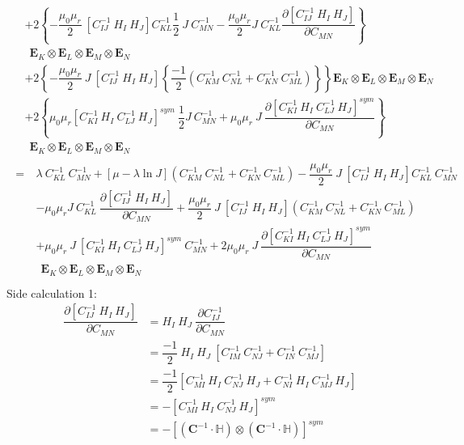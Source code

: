 \begin{align*}
\begin{split}
&+ 2 \left\lbrace - \dfrac{\mu_0 \mu_r}{2} \ [C^{-1}_{IJ} \ H_I \ H_J] C^{-1}_{KL} \dfrac{1}{2} \ J \ C^{-1}_{MN} - \dfrac{\mu_0 \mu_r}{2} J \ C^{-1}_{KL} \dfrac{\partial [C^{-1}_{IJ} \ H_I \ H_J]}{\partial C_{MN}} \right\rbrace \\
& \ \ \mathbf{E}_K \otimes \mathbf{E}_L \otimes \mathbf{E}_M \otimes \mathbf{E}_N \\
&+ 2 \left\lbrace - \dfrac{\mu_0 \mu_r}{2} \ J \ [C^{-1}_{IJ} \ H_I \ H_J] \left\lbrace \dfrac{-1}{2} (C^{-1}_{KM} \ C^{-1}_{NL} + C^{-1}_{KN} \ C^{-1}_{ML}) \right\rbrace \right\rbrace \mathbf{E}_K \otimes \mathbf{E}_L \otimes \mathbf{E}_M \otimes \mathbf{E}_N \\
&+ 2 \left\lbrace \mu_0 \mu_r [C^{-1}_{KI} \ H_I \ C^{-1}_{LJ} \ H_J]^{sym} \ \dfrac{1}{2} J \ C^{-1}_{MN} + \mu_0 \mu_r \ J \ \dfrac{\partial [C^{-1}_{KI} \ H_I \ C^{-1}_{LJ} \ H_J]^{sym}}{\partial C_{MN}} \right\rbrace \\
& \ \ \mathbf{E}_K \otimes \mathbf{E}_L \otimes \mathbf{E}_M \otimes \mathbf{E}_N
\end{split}\\
\begin{split}
=\ & \lambda \ C^{-1}_{KL} \ C^{-1}_{MN} + [\mu - \lambda \ln J] \left( C^{-1}_{KM} \ C^{-1}_{NL} + C^{-1}_{KN} \ C^{-1}_{ML} \right) - \dfrac{\mu_0 \mu_r}{2} \ J \ [C^{-1}_{IJ} \ H_I \ H_J] C^{-1}_{KL} \ C^{-1}_{MN}  \\
&- \mu_0 \mu_r J \ C^{-1}_{KL} \ \dfrac{\partial [C^{-1}_{IJ} \ H_I \ H_J]}{\partial C_{MN}} + \dfrac{\mu_0 \mu_r}{2} \ J \ [C^{-1}_{IJ} \ H_I \ H_J] (C^{-1}_{KM} \ C^{-1}_{NL} + C^{-1}_{KN} \ C^{-1}_{ML}) \\
&+ \mu_0 \mu_r \ J \ [C^{-1}_{KI} \ H_I \ C^{-1}_{LJ} \ H_J]^{sym} \ C^{-1}_{MN} + 2 \mu_0 \mu_r \ J \ \dfrac{\partial [C^{-1}_{KI} \ H_I \ C^{-1}_{LJ} \ H_J]^{sym}}{\partial C_{MN}} \\
& \ \ \mathbf{E}_K \otimes \mathbf{E}_L \otimes \mathbf{E}_M \otimes \mathbf{E}_N
\end{split}\\
\end{align*}
Side calculation 1:
\begin{align*}
\dfrac{\partial [C^{-1}_{IJ} \ H_I \ H_J]}{\partial C_{MN}} &= H_I \ H_J \ \dfrac{\partial C^{-1}_{IJ}}{\partial C_{MN}}\\
&= \dfrac{-1}{2} \ H_I \ H_J \ [C^{-1}_{IM} \ C^{-1}_{NJ} + C^{-1}_{IN} \ C^{-1}_{MJ}]\\
&= \dfrac{-1}{2} [C^{-1}_{MI} \ H_I \ C^{-1}_{NJ} \ H_J + C^{-1}_{NI} \ H_I \ C^{-1}_{MJ} \ H_J]\\
&= - [C^{-1}_{MI} \ H_I \ C^{-1}_{NJ} \ H_J]^{sym}\\
&= - [ (\mathbf{C}^{-1} \cdot \mathbb{H}) \otimes (\mathbf{C}^{-1} \cdot \mathbb{H}) ]^{sym}
\end{align*}
